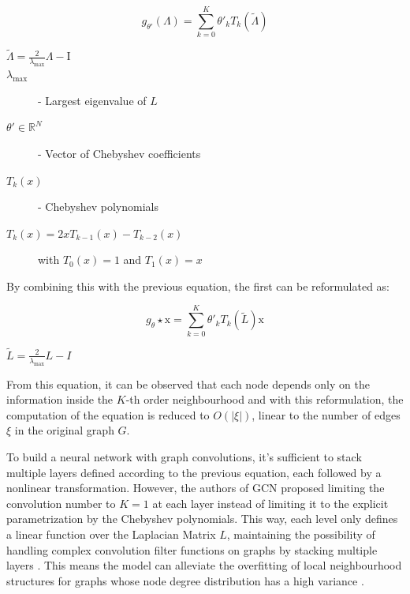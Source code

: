 \begin{equation}
	g_{\theta'}(\Lambda) = \sum^K_{k=0} \theta'_k T_k(\tilde{\Lambda})    
\end{equation}

\begin{description}
	\item[$\tilde{\Lambda} = \frac{2}{\lambda_\text{max}} \Lambda - \text{I}$ ]
	\item[$\lambda_\text{max}$] - Largest eigenvalue of $L$
	\item[$\theta' \in \mathbb{R}^N$] - Vector of Chebyshev coefficients
	\item[$T_k(x)$] - Chebyshev polynomials
	\item[$T_k(x) = 2 x T_{k - 1} (x) - T_{k - 2}(x)$] with $T_0(x) = 1$ and $T_1(x) = x$
\end{description}

By combining this with the previous equation, the first can be reformulated as:

\begin{equation}
	g_\theta \star \text{x} = \sum^K_{k=0} \theta'_k T_k(\tilde{L}) \text{x}
\end{equation}

\begin{description}
	\item[$\tilde{L} = \frac{2}{\lambda_\text{max}} L - I$]
\end{description}


From this equation, it can be observed that each node depends only on the information inside the $K$-th order neighbourhood and with this reformulation, the computation of the equation is reduced to $O(|\xi|)$, linear to the number of edges $\xi$ in the original graph $G$. \par

To build a neural network with graph convolutions, it's sufficient to stack multiple layers defined according to the previous equation, each followed by a nonlinear transformation. However, the authors of \ac{GCN} \cite{kipfSemiSupervisedClassificationGraph2017} proposed limiting the convolution number to $K = 1$ at each layer instead of limiting it to the explicit parametrization by the Chebyshev polynomials. This way, each level only defines a linear function over the Laplacian Matrix $L$, maintaining the possibility of handling complex convolution filter functions on graphs by stacking multiple layers \cite{kipfSemiSupervisedClassificationGraph2017, tangGraphNeuralNetworks2022}. This means the model can alleviate the overfitting of local neighbourhood structures for graphs whose node degree distribution has a high variance \cite{kipfSemiSupervisedClassificationGraph2017, tangGraphNeuralNetworks2022}.

